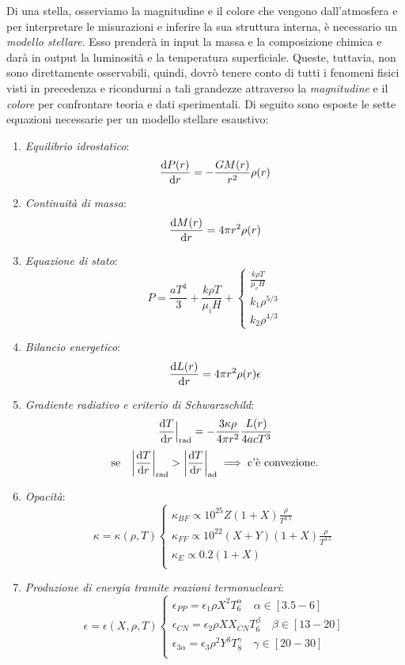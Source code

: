 Di una stella, osserviamo la magnitudine e il colore che vengono dall'atmosfera e per interpretare le misurazioni e inferire la sua struttura interna, è necessario un \emph{modello stellare}. Esso prenderà in input la massa e la composizione chimica e darà in output la luminosità e la temperatura superficiale. Queste, tuttavia, non sono direttamente osservabili, quindi, dovrò tenere conto di tutti i fenomeni fisici visti in precedenza e ricondurmi a tali grandezze attraverso la \emph{magnitudine} e il \emph{colore} per confrontare teoria e dati sperimentali. Di seguito sono esposte le sette equazioni necessarie per un modello stellare esaustivo:
\begin{enumerate}
    \item \emph{Equilibrio idrostatico}:
    \[
    \dfrac{\mathop{}\!\mathrm{d} P(r)}{\mathop{}\!\mathrm{d} r} = -\dfrac{G M(r)}{r^2} \rho(r)
    \]
    \item \emph{Continuità di massa}:
    \[
    \dfrac{\mathop{}\!\mathrm{d} M(r)}{\mathop{}\!\mathrm{d} r} = 4 \pi r^2 \rho(r)
    \]
    \item \emph{Equazione di stato}:
    \[
    P = \dfrac{aT^4}{3} + \dfrac{k \rho T}{\mu_i H} + 
    \begin{cases} 
    \frac{k \rho T}{\mu_e H} \\ 
    k_1 \rho^{5/3} \\ 
    k_2 \rho^{4/3}
    \end{cases}
    \]
    \item \emph{Bilancio energetico}:
    \[
    \dfrac{\mathop{}\!\mathrm{d} L(r)}{\mathop{}\!\mathrm{d} r} = 4 \pi r^2 \rho(r) \epsilon
    \]
    \item \emph{Gradiente radiativo e criterio di Schwarzschild}:
    \[
    \dfrac{\mathop{}\!\mathrm{d} T}{\mathop{}\!\mathrm{d} r}\Big|_\textup{rad} = - \dfrac{3 \kappa \rho}{4 \pi r^2} \dfrac{L(r)}{4 a c T^3}
    \]
    \[
    \text{se} \quad \abs*{\dfrac{\ud T}{\ud r}}_\textup{rad} > \abs*{\dfrac{\ud T}{\ud r}}_\textup{ad} \implies \text{c'è convezione.}
    \]
    \item \emph{Opacità}:
    \[
    \kappa = \kappa(\rho, T) 
    \begin{cases} 
    \kappa_{BF} \propto 10^{25} Z(1 + X) \frac{\rho}{T^{3.5}} \\ 
    \kappa_{FF} \propto 10^{22} (X+Y)(1+X) \frac{\rho}{T^{3.5}} \\ 
    \kappa_{E} \propto 0.2 (1+X) \\ 
    \end{cases}
    \]
    \item \emph{Produzione di energia tramite reazioni termonucleari}:
    \[
    \epsilon = \epsilon(X, \rho, T) 
    \begin{cases} \epsilon_{PP} = \epsilon_1 \rho X^2 T_6^\alpha \quad \alpha \in [3.5 - 6] \\ 
    \epsilon_{CN} = \epsilon_2 \rho X X_{CN} T_6^\beta \quad \beta \in [13 - 20] \\ 
    \epsilon_{3\alpha} = \epsilon_3 \rho^2 Y^3 T_8^\gamma \quad \gamma \in [20 - 30] \\
    \end{cases}
    \]
\end{enumerate}